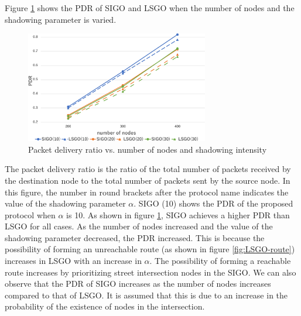 \documentclass[conference]{IEEEtran}
\begin{document}
Figure \ref{fig:PDR} shows the PDR of SIGO and LSGO when the number of nodes and the shadowing parameter is varied. 
\begin{figure}[!ht]
\centering
\includegraphics[width=80mm]{figures/PDR.eps}
\caption{Packet delivery ratio vs. number of nodes and shadowing intensity}
\label{fig:PDR}
\end{figure}
The packet delivery ratio is the ratio of the total number of packets received by the destination node to the total number of packets sent by the source node.
In this figure, the number in round brackets after the protocol name indicates the value of the shadowing parameter $\alpha$. SIGO (10) shows the PDR of the proposed protocol when $\alpha$ is 10.
As shown in figure \ref{fig:PDR}, SIGO achieves a higher PDR than LSGO for all cases. 
As the number of nodes increased and the value of the shadowing parameter decreased, the PDR increased. This is because the possibility of forming an unreachable route (as shown in figure \ref{fig:LSGO-route}) increases in LSGO with an increase in $\alpha$. The possibility of forming a reachable route increases by prioritizing street intersection nodes in the SIGO.
We can also observe that the PDR of SIGO increases as the number of nodes increases compared to that of LSGO. It is assumed that this is due to an increase in the probability of the existence of nodes in the intersection. 
\end{document}
